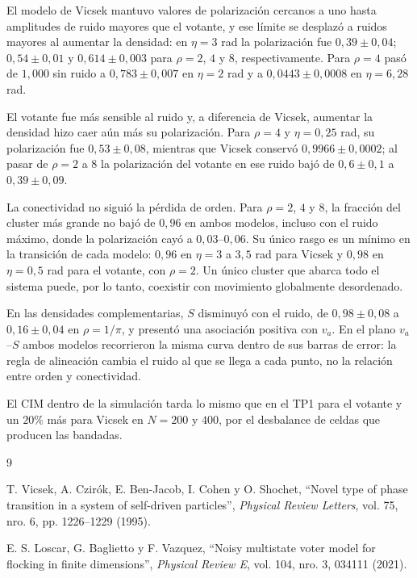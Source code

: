 \documentclass[11pt,a4paper]{article}
\newcommand{\va}{\ensuremath{v_{a}}}
\begin{document}
El modelo de Vicsek mantuvo valores de polarización cercanos a uno hasta
amplitudes de ruido mayores que el votante, y ese límite se desplazó a ruidos
mayores al aumentar la densidad: en $\eta=3$ rad la polarización fue
$0{,}39\pm0{,}04$; $0{,}54\pm0{,}01$ y $0{,}614\pm0{,}003$ para $\rho=2$,
$4$ y $8$, respectivamente. Para $\rho=4$ pasó de $1{,}000$ sin ruido a
$0{,}783\pm0{,}007$ en $\eta=2$ rad y a $0{,}0443\pm0{,}0008$ en
$\eta=6{,}28$ rad.

El votante fue más sensible al ruido y, a diferencia de Vicsek, aumentar la
densidad hizo caer aún más su polarización. Para $\rho=4$ y $\eta=0{,}25$
rad, su polarización fue $0{,}53\pm0{,}08$, mientras que Vicsek conservó
$0{,}9966\pm0{,}0002$; al pasar de $\rho=2$ a $8$ la polarización del votante
en ese ruido bajó de $0{,}6\pm0{,}1$ a $0{,}39\pm0{,}09$.

La conectividad no siguió la pérdida de orden. Para $\rho=2$, $4$ y $8$, la
fracción del cluster más grande no bajó de $0{,}96$ en ambos modelos, incluso
con el ruido máximo, donde la polarización cayó a $0{,}03$--$0{,}06$. Su
único rasgo es un mínimo en la transición de cada modelo: $0{,}96$ en
$\eta=3$ a $3{,}5$ rad para Vicsek y $0{,}98$ en $\eta=0{,}5$ rad para el
votante, con $\rho=2$. Un único cluster que abarca todo el sistema puede,
por lo tanto, coexistir con movimiento globalmente desordenado.

En las densidades complementarias, $S$ disminuyó con el ruido, de
$0{,}98\pm0{,}08$ a $0{,}16\pm0{,}04$ en $\rho=1/\pi$, y presentó una
asociación positiva con \va. En el plano $\va$--$S$ ambos modelos recorrieron
la misma curva dentro de sus barras de error: la regla de alineación cambia
el ruido al que se llega a cada punto, no la relación entre orden y
conectividad.

El CIM dentro de la simulación tarda lo mismo que en el TP1 para el votante y
un $20\%$ más para Vicsek en $N=200$ y $400$, por el desbalance de celdas que
producen las bandadas.

{}
\begin{thebibliography}{9}

T. Vicsek, A. Czirók, E. Ben-Jacob, I. Cohen y O. Shochet,
``Novel type of phase transition in a system of self-driven particles'',
\textit{Physical Review Letters}, vol. 75, nro. 6, pp. 1226--1229 (1995).

E. S. Loscar, G. Baglietto y F. Vazquez,
``Noisy multistate voter model for flocking in finite dimensions'',
\textit{Physical Review E}, vol. 104, nro. 3, 034111 (2021).

\end{thebibliography}
\end{document}
